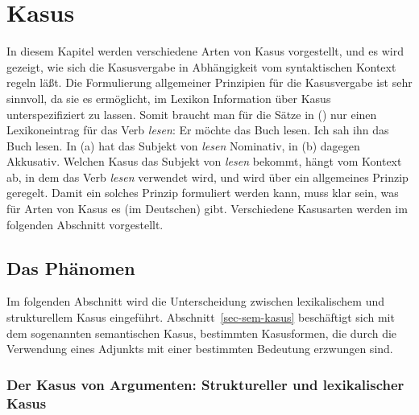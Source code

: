 


\chapter{Kasus}
\label{chap-kasus}

In diesem Kapitel werden verschiedene Arten von Kasus vorgestellt, und es wird gezeigt,
wie sich die Kasusvergabe in Abhängigkeit vom syntaktischen Kontext regeln läßt.
Die Formulierung allgemeiner Prinzipien für die Kasusvergabe ist sehr sinnvoll,
da sie es ermöglicht, im Lexikon Information über Kasus unterspezifiziert zu lassen.
Somit braucht man für die Sätze in () nur einen Lexikoneintrag für das Verb \emph{lesen}:
\eal
\ex Er möchte das Buch lesen.
\ex Ich sah ihn das Buch lesen.
\zl
In (a) hat das Subjekt von \emph{lesen} Nominativ, in (b) dagegen Akkusativ.
Welchen Kasus das Subjekt von \emph{lesen} bekommt, hängt vom Kontext ab, in dem das
Verb \emph{lesen} verwendet wird, und wird über ein allgemeines Prinzip geregelt. Damit
ein solches Prinzip formuliert werden kann, muss klar sein, was für Arten von Kasus es
(im Deutschen) gibt. Verschiedene Kasusarten werden im folgenden Abschnitt vorgestellt.

\section{Das Phänomen}

Im folgenden Abschnitt wird die Unterscheidung zwischen lexikalischem und strukturellem
Kasus eingeführt. Abschnitt~\ref{sec-sem-kasus} beschäftigt sich mit dem sogenannten
semantischen Kasus, bestimmten Kasusformen, die durch die Verwendung eines Adjunkts
mit einer bestimmten Bedeutung erzwungen sind. 

\subsection{Der Kasus von Argumenten: Struktureller und lexikalischer Kasus}
\label{sec-struk-lex-kas}
\label{sec-struc-lex-kas}
%

